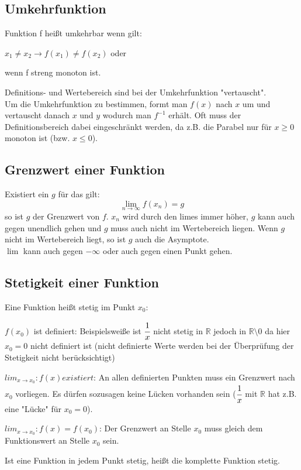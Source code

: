 \documentclass[a4paper]{scrartcl}
\begin{document}
    \subsection{Umkehrfunktion}
    Funktion f heißt umkehrbar wenn gilt:     
    \begin{description}
        \item $x_1 \neq x_2 \rightarrow f(x_1) \neq f(x_2)$ oder
        \item wenn f streng monoton ist.
        \end{description}
    Definitions- und Wertebereich sind bei der Umkehrfunktion "vertauscht". 
    \\ Um die Umkehrfunktion zu bestimmen, formt man $f(x)$ nach $x$ um und vertauscht danach $x$ und $y$ wodurch man $f^{-1}$ erhält.
    Oft muss der Definitionsbereich dabei eingeschränkt werden, da z.B. die Parabel nur für $x \geq 0$ monoton ist (bzw. $x \leq 0$). 

    \subsection{Grenzwert einer Funktion}
    Existiert ein $g$ für das gilt:
    \begin{equation*}
        \lim \limits_{n \to \infty}f(x_n) = g
    \end{equation*} 
    so ist $g$ der Grenzwert von $f$.
    $x_n$ wird durch den limes immer höher, $g$ kann auch gegen unendlich gehen und $g$ muss auch nicht im Wertebereich liegen. Wenn $g$ nicht im Wertebereich liegt, so ist $g$ auch die Asymptote. \\
    $\lim$ kann auch gegen $-\infty$ oder auch gegen einen Punkt gehen.

    \subsection{Stetigkeit einer Funktion}
        Eine Funktion heißt stetig im Punkt $x_0$:
        \begin{description}
            \item $f(x_0)$ ist definiert: Beispielsweiße ist $\cfrac{1}{x}$ nicht stetig in $\mathbb{R}$ jedoch in $\mathbb{R} \setminus 0$ da hier $x_0 = 0$ nicht definiert ist (nicht definierte Werte werden bei der Überprüfung der Stetigkeit nicht berücksichtigt)
            \item $lim_{x \to x_0}: f(x) existiert$: An allen definierten Punkten muss ein Grenzwert nach $x_0$ vorliegen. Es dürfen sozusagen keine Lücken vorhanden sein ($\cfrac{1}{x}$ mit $\mathbb{R}$ hat z.B. eine "Lücke" für $x_0 = 0$).
            \item $lim_{x \to x_0}: f(x) = f(x_0)$: Der Grenzwert an Stelle $x_0$ muss gleich dem Funktionswert an Stelle $x_0$ sein.
        \end{description}
        Ist eine Funktion in jedem Punkt stetig, heißt die komplette Funktion stetig.
\end{document}
